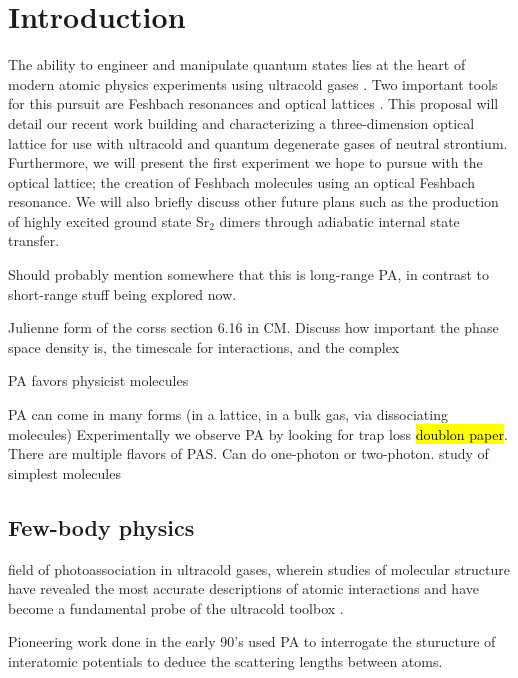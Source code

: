 \chapter{Introduction}
\label{ch:intro}

The ability to engineer and manipulate quantum states lies at the heart of modern atomic physics experiments using ultracold gases \cite{Davis1995,Anderson1995,Bradley1995,DeMarco1999,Lang2008,Ni2008}. 
Two important tools for this pursuit are Feshbach resonances \cite{Chin2010,Kohler2006} and optical lattices \cite{Bloch2008}. 
This proposal will detail our recent work building and characterizing a three-dimension optical lattice for use with ultracold and quantum degenerate gases of neutral strontium.
Furthermore, we will present the first experiment we hope to pursue with the optical lattice; the creation of Feshbach molecules using an optical Feshbach resonance. 
We will also briefly discuss other future plans such as the production of highly excited ground state Sr$_2$ dimers through adiabatic internal state transfer.

Should probably mention somewhere that this is long-range PA, in contrast to short-range stuff being explored now.

Julienne form of the corss section 6.16 in CM. Discuss how important the phase space density is, the timescale for interactions, and the complex 

PA favors physicist molecules

PA can come in many forms (in a lattice, in a bulk gas, via dissociating molecules) Experimentally we observe PA by looking for trap loss \hl{doublon paper}.
There are multiple flavors of PAS. Can do one-photon or two-photon.
study of simplest molecules

\cite{Aman2018}

\section{Few-body physics}
\label{sec:few-body}

field of photoassociation in ultracold gases, wherein studies of molecular structure have revealed the most accurate descriptions of atomic interactions and have become a fundamental probe of the ultracold toolbox \cite{Jones2006}.



Pioneering work done in the early 90's used PA to interrogate the sturucture of interatomic potentials to deduce the scattering lengths between atoms.

